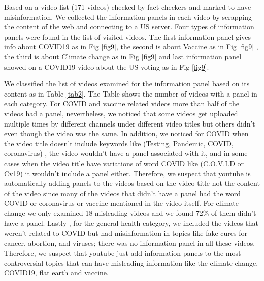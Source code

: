 \documentclass{article}
\begin{document}
Based on a video list (171 videos) checked by fact checkers and marked to have misinformation. We collected the information panels in each video by scrapping the content of the web and connecting to a US server. Four types of information panels were found in the list of visited videos. The first information panel gives info about COVID19 as in Fig \ref{fig9}, the second is about Vaccine as in Fig \ref{fig9} , the third is about Climate change as in Fig \ref{fig9} and last information panel showed on a COVID19 video about the US voting as in Fig \ref{fig9}.

We classified the list of videos examined for the information panel based on its content as in Table \ref{tab2}. The Table shows the number of videos with a panel in each category. For COVID and vaccine related videos more than half of the videos had a panel, nevertheless, we noticed that some videos get uploaded multiple times by different channels under different video titles but others didn’t even though the video was the same. In addition, we noticed for COVID when the video title doesn’t include keywords like (Testing, Pandemic, COVID, coronavirus) , the video wouldn’t have a panel associated with it, and in some cases when the video title have variations of word COVID like (C.O.V.I.D or Cv19) it wouldn’t include a panel either. Therefore, we suspect that youtube is automatically adding panels to the videos based on the video title not the content of the video since many of the videos that didn’t have a panel had the word COVID or coronavirus or vaccine mentioned in the video itself.
For climate change we only examined 18 misleading videos and we found 72\% of them didn’t have a panel. Lastly , for the general health category, we included the videos that weren’t related to COVID but had misinformation in topics like fake cures for cancer, abortion,  and viruses; there was no information panel in all these videos. Therefore, we suspect that youtube just add information panels to  the most controversial topics that can have misleading information like the climate change, COVID19, flat earth and  vaccine. 
\end{document}
